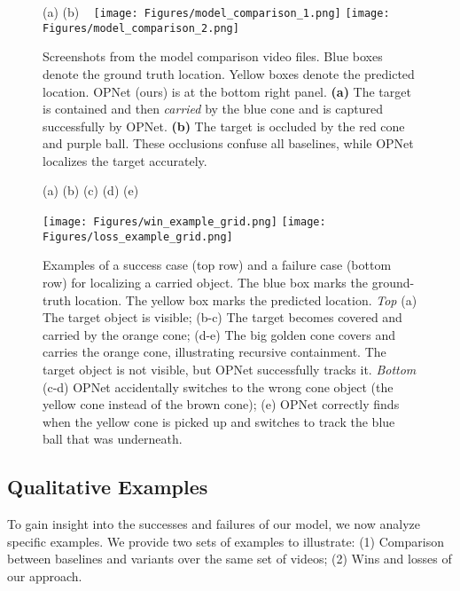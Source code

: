 \documentclass[]{llncs}
\begin{document}
\begin{figure}[h!]
    \begin{center}
    (a) \hspace{155pt}
    (b) \hspace{155pt}~
    \texttt{[image: Figures/model\_comparison\_1.png]}
    \texttt{[image: Figures/model\_comparison\_2.png]}
    \caption{Screenshots from the model comparison video files. Blue boxes denote the ground truth location. Yellow boxes denote the predicted location. OPNet (ours) is at the bottom right panel. \textbf{(a)} The target is contained and then \textit{carried} by the blue cone and is captured successfully by OPNet. \textbf{(b)} The target is occluded by the red cone and purple ball. These occlusions confuse all baselines, while OPNet  localizes the target accurately.
    \label{fig:all_models_comparison}}
    \end{center}
\end{figure}

\begin{figure}[t!]
    \hspace{25pt} (a) \hspace{55pt}(b) \hspace{55pt}(c) \hspace{50pt} (d) \hspace{50pt} (e)
    \begin{center}
    \texttt{[image: Figures/win\_example\_grid.png]}
    \texttt{[image: Figures/loss\_example\_grid.png]}
    \caption{Examples of a success case (top row) and a failure case  (bottom row) for localizing a carried object. The blue box marks the ground-truth location. The yellow box marks the predicted location. \textit{Top} (a) The target object is visible; (b-c) The target becomes covered and carried by the orange cone; (d-e) The big golden cone covers and carries the orange cone, illustrating recursive containment. The target object is not visible, but OPNet successfully tracks it. \textit{Bottom} (c-d) OPNet accidentally switches to the wrong cone object (the yellow cone instead of the brown cone);
    (e) OPNet correctly finds when the yellow cone is picked up and switches to track the blue ball that was underneath.
    \label{fig:win_loss}}
    \end{center}
\end{figure}

\subsection{Qualitative Examples}
To gain insight into the successes and failures of our model, we now analyze specific examples. We provide two sets of examples to illustrate: (1) Comparison between baselines and variants over the same set of videos; (2) Wins and losses of our approach.
\end{document}
